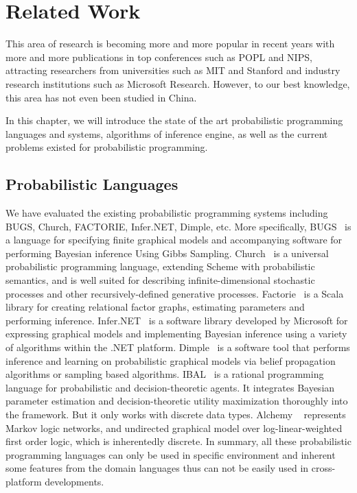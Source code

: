 \chapter{Related Work}
\label{chap:related}
This area of research is becoming more and more popular in recent years with more and more publications in top conferences such as POPL and NIPS, attracting researchers from universities such as MIT and Stanford and industry research institutions such as Microsoft Research. However, to our best knowledge, this area has not even been studied in China. 

In this chapter, we will introduce the state of the art probabilistic programming languages and systems, algorithms of inference engine, as well as the current problems existed for probabilistic programming.

\section{Probabilistic Languages}
We have evaluated the existing probabilistic programming systems including BUGS, Church, FACTORIE, Infer.NET, Dimple, etc. More specifically, BUGS~\cite{bugs} is a language for specifying finite graphical models and accompanying software for performing Bayesian inference Using Gibbs Sampling. Church~\cite{church} is a universal probabilistic programming language, extending Scheme with probabilistic semantics, and is well suited for describing infinite-dimensional stochastic processes and other recursively-defined generative processes. Factorie~\cite{factorie} is a Scala library for creating relational factor graphs, estimating parameters and performing inference. Infer.NET~\cite{infernet} is a software library developed by Microsoft for expressing graphical models and implementing Bayesian inference using a variety of algorithms within the .NET platform. Dimple~\cite{dimple} is a software tool that performs inference and learning on probabilistic graphical models via belief propagation algorithms or sampling based algorithms. IBAL~\cite{ibal} is a rational programming language for probabilistic and decision-theoretic agents. It integrates Bayesian parameter estimation and decision-theoretic utility maximization thoroughly into the framework. But it only works with discrete data types. Alchemy ~\cite{alchemy} represents Markov logic networks, and undirected graphical model over log-linear-weighted first order logic, which is inherentedly discrete. In summary, all these probabilistic programming languages can only be used in specific environment and inherent some features from the domain languages thus can not be easily used in cross-platform developments.

